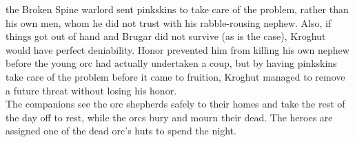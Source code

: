 the Broken Spine warlord sent pinkskins to take care of the problem, rather than his own men, whom he did not trust with his rabble-rousing nephew. Also, if things got out of hand and Brugar did not survive (as is the case), Kroghut would have perfect deniability. Honor prevented him from killing his own nephew before the young orc had actually undertaken a coup, but by having pinkskins take care of the problem before it came to fruition, Kroghut managed to remove a future threat without losing his honor.\\

The companions see the orc shepherds safely to their homes and take the rest of the day off to rest, while the orcs bury and mourn their dead. The heroes are assigned one of the dead orc's huts to spend the night.\\

